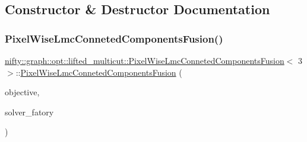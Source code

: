 \subsection{Constructor \& Destructor Documentation}
\mbox{\label{classnifty_1_1graph_1_1opt_1_1lifted__multicut_1_1PixelWiseLmcConnetedComponentsFusion_3_013_01_4_ae725979a8cab2b3252fa063c064930ce}} 
\subsubsection{\texorpdfstring{Pixel\+Wise\+Lmc\+Conneted\+Components\+Fusion()}{PixelWiseLmcConnetedComponentsFusion()}}
{\footnotesize\ttfamily \hyperlink{classnifty_1_1graph_1_1opt_1_1lifted__multicut_1_1PixelWiseLmcConnetedComponentsFusion}{nifty\+::graph\+::opt\+::lifted\+\_\+multicut\+::\+Pixel\+Wise\+Lmc\+Conneted\+Components\+Fusion}$<$ 3 $>$\+::\hyperlink{classnifty_1_1graph_1_1opt_1_1lifted__multicut_1_1PixelWiseLmcConnetedComponentsFusion}{Pixel\+Wise\+Lmc\+Conneted\+Components\+Fusion} (\begin{DoxyParamCaption}\item[{const \hyperlink{classnifty_1_1graph_1_1opt_1_1lifted__multicut_1_1PixelWiseLmcObjective}{Pixel\+Wise\+Lmc\+Objective}$<$ \hyperlink{classnifty_1_1graph_1_1opt_1_1lifted__multicut_1_1PixelWiseLmcConnetedComponentsFusion_3_013_01_4_a722656c7be957d378dc3b6fa47b387ad}{D\+IM} $>$ \&}]{objective,  }\item[{std\+::shared\+\_\+ptr$<$ \hyperlink{classnifty_1_1graph_1_1opt_1_1lifted__multicut_1_1PixelWiseLmcConnetedComponentsFusion_3_013_01_4_a9e78fe926b2fe9e0d3f4b8fa2c4fed1f}{C\+C\+Lmc\+Factory\+Base} $>$}]{solver\+\_\+fatory }\end{DoxyParamCaption})\hspace{0.3cm}{\ttfamily [inline]}}



